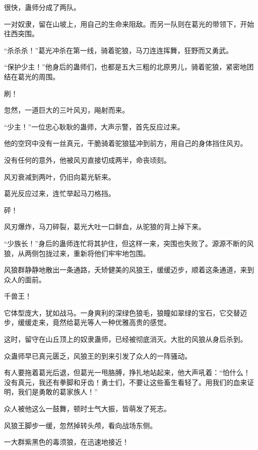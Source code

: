 \begin{this_body}
很快，蛊师分成了两队。

一对奴隶，留在山坡上，用自己的生命来阻敌。而另一队则在葛光的带领下，开始往西突围。

“杀杀杀！”葛光冲杀在第一线，骑着驼狼，马刀连连挥舞，狂野而又勇武。

“保护少主！”他身后的蛊师们，也都是五大三粗的北原男儿，骑着驼狼，紧密地团结在葛光的周围。

刷！

忽然，一道巨大的三叶风刃，飚射而来。

“少主！”一位忠心耿耿的蛊师，大声示警，首先反应过来。

他的空窍中没有一丝真元，干脆骑着驼狼猛冲到前方，用自己的身体挡住风刃。

没有任何的意外，他被风刃直接切成两半，命丧顷刻。

风刃衰减到两叶，仍旧向葛光斩来。

葛光反应过来，连忙举起马刀格挡。

砰！

风刃爆炸，马刀碎裂，葛光大吐一口鲜血，从驼狼的背上掉下来。

“少族长！”身后的蛊师连忙将其护住，但这样一来，突围也失败了。源源不断的风狼，从两侧包拢过来，重新将他们牢牢地包围。

风狼群静静地散出一条通路，夭矫健美的风狼王，缓缓迈步，顺着这条通道，来到众人的面前。

千兽王！

它体型庞大，犹如战马。一身爽利的深绿色狼毛，狼瞳如翠绿的宝石，它交替迈步，缓缓走来，竟然给葛光等人一种优雅高贵的感觉。

这时，留守在山丘顶上的奴隶蛊师，已经被彻底消灭。大批的风狼从身后杀到。

众蛊师早已真元匮乏，风狼王的到来引发了众人的一阵骚动。

有人要拖着葛光后退，但葛光一甩胳膊，挣扎地站起来，他大声吼着：“怕什么！没有真元，我还有拳脚和牙齿！勇士们，不要让这些畜生看轻了。用我们的血来证明，我们是勇敢的葛家族人！”

众人被他这么一鼓舞，顿时士气大振，皆萌发了死志。

风狼王脚步一缓，忽然掉转头颅，看向战场东侧。

一大群紫黑色的毒须狼，在迅速地接近！

\end{this_body}

